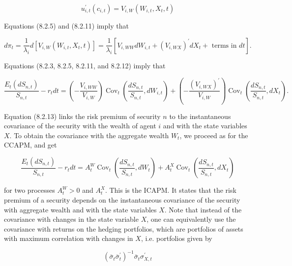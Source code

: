 \documentclass[\topdir/lecture\_notes.tex]{subfiles}
\begin{document}
\begin{equation}
u_{i, t}^{\prime}\left(c_{i, t}\right)=V_{i, W}\left(W_{i, t}, X_{t}, t\right) \label{eq:8.2.11}
\end{equation}

Equations (8.2.5) and (8.2.11) imply that

\begin{equation}
d \pi_{t}=\frac{1}{\lambda_{i}} d\left[V_{i, W}\left(W_{i, t}, X_{t}, t\right)\right]=\frac{1}{\lambda_{i}}\left[V_{i, W W} d W_{i, t}+\left(V_{i, W X}\right)^{\prime} d X_{t}+\text { terms in } d t\right] . \label{eq:8.2.12}
\end{equation}

Equations (8.2.3, 8.2.5, 8.2.11, and 8.2.12) imply that

\begin{equation}
\frac{E_{t}\left(d S_{n, t}\right)}{S_{n, t}}-r_{t} d t=\left(-\frac{V_{i, W W}}{V_{i, W}}\right) \operatorname{Cov}_{t}\left(\frac{d S_{n, t}}{S_{n, t}}, d W_{i, t}\right)+\left(-\frac{\left(V_{i, W X}\right)^{\prime}}{V_{i, W}}\right) \operatorname{Cov}_{t}\left(\frac{d S_{n, t}}{S_{n, t}}, d X_{t}\right) . \label{eq:8.2.13}
\end{equation}

Equation (8.2.13) links the risk premium of security $n$ to the instantaneous covariance of the security with the wealth of agent $i$ and with the state variables $X$. To obtain the covariance with the aggregate wealth $W_{t}$, we proceed as for the CCAPM, and get

\begin{equation}
\frac{E_{t}\left(d S_{n, t}\right)}{S_{n, t}}-r_{t} d t=A_{t}^{W} \operatorname{Cov}_{t}\left(\frac{d S_{n, t}}{S_{n, t}}, d W_{t}\right)+A_{t}^{X} \operatorname{Cov}_{t}\left(\frac{d S_{n, t}}{S_{n, t}}, d X_{t}\right) \label{eq:8.2.14}
\end{equation}

for two processes $A_{t}^{W}>0$ and $A_{t}^{X}$. This is the ICAPM. It states that the risk premium of a security depends on the instantaneous covariance of the security with aggregate wealth and with the state variables $X$. Note that instead of the covariance with changes in the state variable $X$, one can equivalently use the covariance with returns on the hedging portfolios, which are portfolios of assets with maximum correlation with changes in $X$, i.e. portfolios given by

\begin{equation}
\left(\bar{\sigma}_{t} \bar{\sigma}_{t}^{\prime}\right)^{-1} \bar{\sigma}_{t} \sigma_{X, t}^{\prime}
\end{equation}
\end{document}
